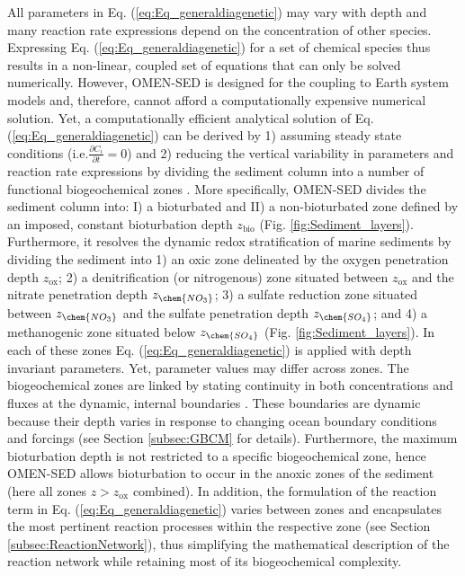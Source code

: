 \documentclass[gmd, manuscript]{copernicus}
\begin{document}
All parameters in Eq. (\ref{eq:Eq_generaldiagenetic}) may vary with depth and many reaction rate expressions depend on the concentration of other species. 
Expressing Eq. (\ref{eq:Eq_generaldiagenetic}) for a set of chemical species thus results in a non-linear, coupled set of equations that can only 
be solved numerically. 
However, OMEN-SED is designed for the coupling to Earth system models and, therefore, cannot afford a computationally expensive numerical solution. 
Yet, a computationally efficient analytical solution of Eq. (\ref{eq:Eq_generaldiagenetic}) can be derived by 1) assuming steady state conditions (i.e.$ \frac{\partial C_i}{\partial t}=0$) 
and 2) reducing the vertical variability in parameters and reaction rate expressions by dividing the sediment column into a number of functional 
biogeochemical zones \citep[Fig. \ref{fig:Sediment_layers}, compare e.g. ][for similar solutions]{billen1982idealized, goloway_diagenetic_1982, tromp_global_1995, gypens_simple_2008}. 
More specifically, OMEN-SED divides the sediment column into: I) a bioturbated and 
II) a non-bioturbated zone defined by an imposed, constant bioturbation depth $z_{\mathrm{bio}}$ (Fig. \ref{fig:Sediment_layers}). Furthermore, it resolves the dynamic redox stratification of marine sediments by dividing 
the sediment into 1) an oxic zone delineated by the oxygen penetration depth $z_{\mathrm{ox}}$; 2) a denitrification (or nitrogenous) zone situated between $z_{\mathrm{ox}}$ and the nitrate penetration depth $z_{\chem{NO_3}}$;
3) a sulfate reduction zone situated between $z_{\chem{NO_3}}$ and the sulfate penetration depth $z_{\chem{SO_4}}$; and 4) a methanogenic zone situated below $z_{\chem{SO_4}}$ (Fig. \ref{fig:Sediment_layers}).  
In each of these zones Eq. (\ref{eq:Eq_generaldiagenetic}) is applied with depth invariant parameters. Yet, parameter values may differ across zones. 
The biogeochemical zones are linked by stating continuity in both concentrations and fluxes at the dynamic, internal boundaries 
\citep[$z_b \in \{z_{\mathrm{bio}}, z_{\mathrm{ox}}, z_{\chem{NO_3}}, z_{\chem{SO_4}} \}$, compare e.g.][]{billen1982idealized, ruardij_benthic_1995}. These boundaries are dynamic because their depth varies in response to changing ocean 
boundary conditions and forcings (see Section \ref{subsec:GBCM} for details). Furthermore, the maximum bioturbation depth is not restricted to a specific biogeochemical zone, 
hence OMEN-SED allows bioturbation to occur in the anoxic zones of the sediment (here all zones $z > z_{\mathrm{ox}}$ combined). 
In addition, the formulation of the reaction term in Eq. (\ref{eq:Eq_generaldiagenetic}) varies between zones and encapsulates the most pertinent reaction 
processes within the respective zone (see Section \ref{subsec:ReactionNetwork}), thus simplifying the mathematical description of the reaction network while 
retaining most of its biogeochemical complexity.
\end{document}
